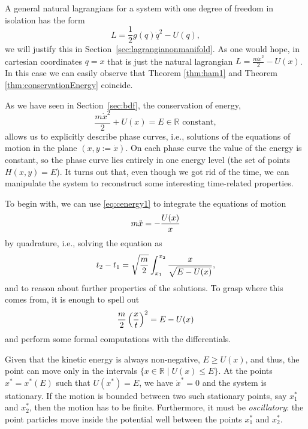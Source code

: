 \documentclass[english,fontsize=11pt,paper=a5,oneside]{scrbook}
\newcommand{\R}{\mathbb{R}}
\let\d\relax
\newcommand{\d}{\mathrm{d}}
\theoremstyle{definition}
\begin{document}
A general natural lagrangians for a system with one degree of freedom in isolation has the form
\begin{equation}
  L = \frac12 g(q)\dot q^2 - U(q),
\end{equation}
we will justify this in Section~\ref{sec:lagrangianonmanifold}.
As one would hope, in cartesian coordinates $q = x$ that is just the natural lagrangian $L = \frac{m \dot x^2}{2} - U(x)$.
In this case we can easily observe that Theorem \ref{thm:ham1} and Theorem \ref{thm:conservationEnergy} coincide.

As we have seen in Section~\ref{sec:bdf}, the conservation of energy,
\begin{equation}\label{eq:cenergy1}
  \frac{m \dot x^2}{2} + U(x) = E \in\R \mbox{ constant},
\end{equation}
allows us to explicitly describe phase curves, i.e., solutions of the equations of motion in the plane $(x, y := \dot x)$.
On each phase curve the value of the energy is constant, so the phase curve lies entirely in one energy level (the set of points $H(x,y)=E$). It turns out that, even though we got rid of the time, we can manipulate the system to reconstruct some interesting time-related properties.

To begin with, we can use \eqref{eq:cenergy1} to integrate the equations of motion
\begin{equation}
  m \ddot x = - \frac{\d U(x)}{\d x}
\end{equation}
by quadrature, i.e., solving the equation as
\begin{equation}
  t_2 - t_1 = \sqrt{\frac m2} \int_{x_1}^{x_2} \frac{\d x}{\sqrt{E-U(x)}},
\end{equation}
and to reason about further properties of the solutions.
To grasp where this comes from, it is enough to spell out
\begin{equation}
  \frac m2 \left(\frac{\d x}{\d t}\right)^2 = E - U(x) 
\end{equation}
and perform some formal computations with the differentials.

Given that the kinetic energy is always non-negative, $E \geq U(x)$, and thus, the point can move only in the intervals $\{ x\in\R \mid U(x) \leq E\}$. At the points $x^* = x^*(E)$ such that $U(x^*) = E$, we have $\dot x^* = 0$ and the system is stationary. If the motion is bounded between two such stationary points, say $x_1^*$ and $x_2^*$, then the motion has to be finite.
Furthermore, it must be \emph{oscillatory}: the point particles move inside the potential well between the points $x_1^*$ and $x_2^*$.
\end{document}
